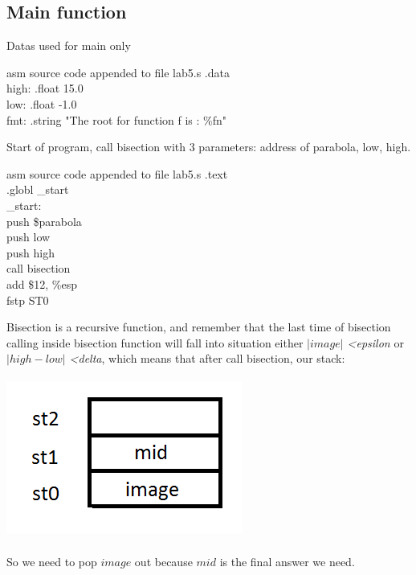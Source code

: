 \documentclass{article}
\begin{document}
\subsection{Main function}
\begin{multicols}{2}
Datas used for main only
\begin{GFT}{asm source code appended to file lab5.s}
\+.data\\
\+high: .float 15.0\\
\+low: .float -1.0\\
\+fmt: .string "The root for function f is : \%f\Backslash{}n"\\
\end{GFT}
Start of program, call bisection with 3 parameters: address of parabola, low, high. \\
\begin{GFT}{asm source code appended to file lab5.s}
\+.text\\
\+.globl \_start\\
\+\_start:\\
\+push \$parabola\\
\+push low\\
\+push high\\
\+call bisection\\
\+add \$12, \%esp\\
\+fstp ST0\\
\end{GFT}
Bisection is a recursive function, and remember that the last time of bisection calling inside bisection function will fall into situation either \textit{$|image|$ \textless epsilon} or \textit{$|high - low|$ \textless delta}, which means that after call bisection, our stack: \\ \\
\includegraphics[scale=0.5]{stack2.png} \\ \\
So we need to pop $image$ out because $mid$ is the final answer we need. \\ \\

\end{multicols}
\end{document}
